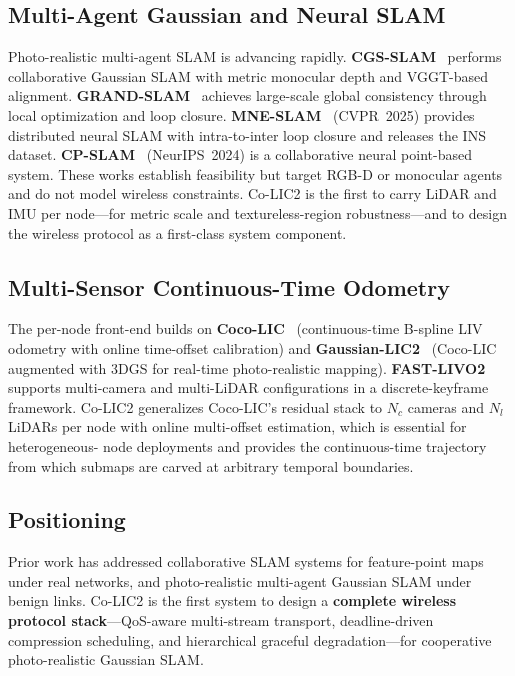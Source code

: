\subsection{Multi-Agent Gaussian and Neural SLAM}

Photo-realistic multi-agent SLAM is advancing rapidly.
\textbf{CGS-SLAM}~\cite{deambrogi2026cgsslam_mob} performs collaborative
Gaussian SLAM with metric monocular depth and VGGT-based alignment.
\textbf{GRAND-SLAM}~\cite{thomas2025grandslam_mob} achieves large-scale global
consistency through local optimization and loop closure.
\textbf{MNE-SLAM}~\cite{deng2025mneslam} (CVPR~2025) provides distributed
neural SLAM with intra-to-inter loop closure and releases the INS dataset.
\textbf{CP-SLAM}~\cite{hu2024cpslam} (NeurIPS~2024) is a collaborative neural
point-based system. These works establish feasibility but target RGB-D or
monocular agents and do not model wireless constraints. Co-LIC2 is the first
to carry LiDAR and IMU per node---for metric scale and textureless-region
robustness---and to design the wireless protocol as a first-class system
component.

\subsection{Multi-Sensor Continuous-Time Odometry}

The per-node front-end builds on \textbf{Coco-LIC}~\cite{lang2023coco_mob}
(continuous-time B-spline LIV odometry with online time-offset calibration)
and \textbf{Gaussian-LIC2}~\cite{lang2026gaussian2_mob} (Coco-LIC augmented
with 3DGS for real-time photo-realistic mapping).
\textbf{FAST-LIVO2}~\cite{zheng2024fastlivo2_mob} supports multi-camera and
multi-LiDAR configurations in a discrete-keyframe framework. Co-LIC2
generalizes Coco-LIC's residual stack to $N_c$ cameras and $N_l$ LiDARs per
node with online multi-offset estimation, which is essential for heterogeneous-
node deployments and provides the continuous-time trajectory from which
submaps are carved at arbitrary temporal boundaries.

\subsection{Positioning}

Prior work has addressed collaborative SLAM systems for feature-point maps
under real networks, and photo-realistic multi-agent Gaussian SLAM under
benign links. Co-LIC2 is the first system to design a \textbf{complete
wireless protocol stack}---QoS-aware multi-stream transport, deadline-driven
compression scheduling, and hierarchical graceful degradation---for
cooperative photo-realistic Gaussian SLAM.
